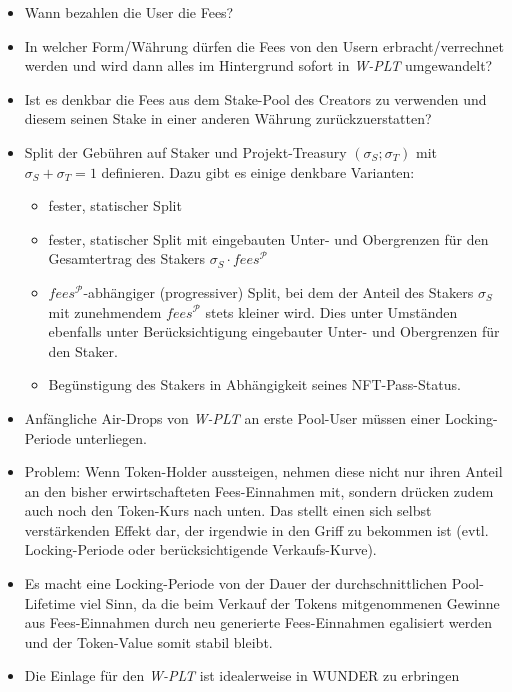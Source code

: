 \begin{itemize}
	\item Wann bezahlen die User die Fees?
	\item In welcher Form/Währung dürfen die Fees von den Usern erbracht/verrechnet werden und wird dann alles im Hintergrund sofort in \textit{W-PLT} umgewandelt?
	\item Ist es denkbar die Fees aus dem Stake-Pool des Creators zu verwenden und diesem seinen Stake in einer anderen Währung zurückzuerstatten?
	\item Split der Gebühren auf Staker und Projekt-Treasury $(\sigma_{S}; \sigma_{T})$ mit $\sigma_{S} + \sigma_{T} = 1$ definieren. Dazu gibt es einige denkbare Varianten:
	\begin{itemize}
		\item fester, statischer Split
		\item fester, statischer Split mit eingebauten Unter- und Obergrenzen für den Gesamtertrag des Stakers $\sigma_{S} \cdot fees^{\mathcal{P}}$
		\item $fees^{\mathcal{P}}$-abhängiger (progressiver) Split, bei dem der Anteil des Stakers $\sigma_{S}$ mit zunehmendem $fees^{\mathcal{P}}$ stets kleiner wird. Dies unter Umständen ebenfalls unter Berücksichtigung eingebauter Unter- und Obergrenzen für den Staker.
		\item Begünstigung des Stakers in Abhängigkeit seines NFT-Pass-Status.
	\end{itemize}	
	\item Anfängliche Air-Drops von \textit{W-PLT} an erste Pool-User müssen einer Locking-Periode unterliegen.
	\item Problem: Wenn Token-Holder aussteigen, nehmen diese nicht nur ihren Anteil an den bisher erwirtschafteten Fees-Einnahmen mit, sondern drücken zudem auch noch den Token-Kurs nach unten. Das stellt einen sich selbst verstärkenden Effekt dar, der irgendwie in den Griff zu bekommen ist (evtl. Locking-Periode oder berücksichtigende Verkaufs-Kurve).
	\item Es macht eine Locking-Periode von der Dauer der durchschnittlichen Pool-Lifetime viel Sinn, da die beim Verkauf der Tokens mitgenommenen Gewinne aus Fees-Einnahmen durch neu generierte Fees-Einnahmen egalisiert werden und der Token-Value somit stabil bleibt.
	\item Die Einlage für den \textit{W-PLT} ist idealerweise in WUNDER zu erbringen 
	
\end{itemize}

